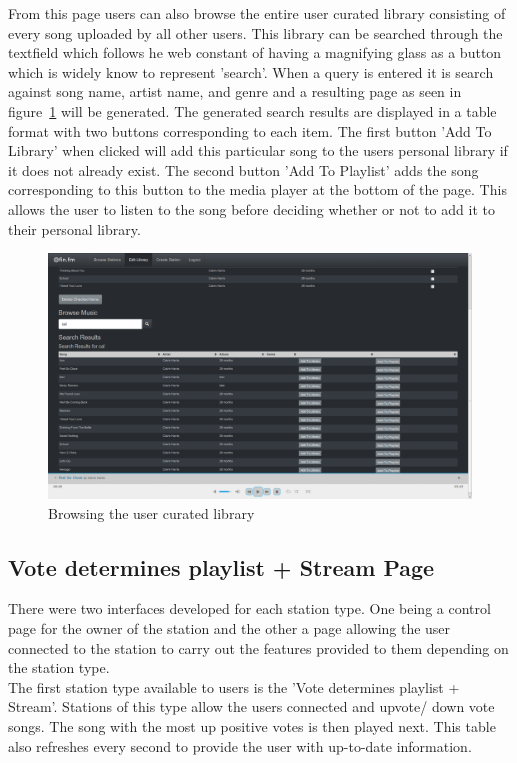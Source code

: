 \documentclass[a4paper, 12pt]{report}
\begin{document}
From this page users can also browse the entire user curated library consisting of every song uploaded by all other users. This library can be searched through the textfield which follows he web constant of having a magnifying glass as a button which is widely know to represent 'search'. When a query is entered it is search against song name, artist name, and genre and a resulting page as seen in figure~\ref{browse-library} will be generated.
The generated search results are displayed in a table format with two buttons corresponding to each item. The first button 'Add To Library' when clicked will add this particular song to the users personal library if it does not already exist. The second button 'Add To Playlist' adds the song corresponding to this button to the media player at the bottom of the page. This allows the user to listen to the song before deciding whether or not to add it to their personal library.   
\begin{figure}[H]
  \centering
    \includegraphics[width=1.0\textwidth]{screenshots/browse-library.png}
    \caption{Browsing the user curated library}
    \label{browse-library}
\end{figure}

\subsection{Vote determines playlist + Stream Page}
There were two interfaces developed for each station type. One being a control page for the owner of the station and the other a page allowing the user connected to the station to carry out the features provided to them depending on the station type. \\
The first station type available to users is the 'Vote determines playlist + Stream'. Stations of this type allow the users connected and upvote/ down vote songs. The song with the most up positive votes is then played next. This table also refreshes every second to provide the user with up-to-date information.\\
\end{document}
